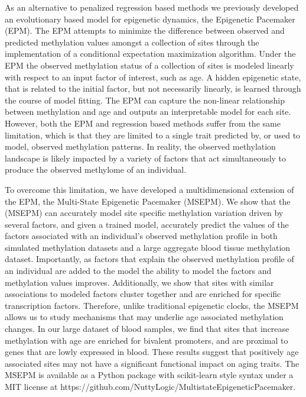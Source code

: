 \documentclass{article}
\begin{document}
{\begin{linenumbers}
As an alternative to penalized regression based methods we previously developed an evolutionary based model for 
epigenetic dynamics, the Epigenetic Pacemaker (EPM)\cite{Farrell2020-bn,Snir2016-dv}. The EPM 
attempts to minimize the difference between observed and predicted methylation values amongst a collection of 
sites through the implementation of a conditional expectation maximization algorithm\cite{Snir2020-tc}. Under the EPM 
the observed methylation status of a collection of sites is modeled linearly with respect to an input factor of
 interest, such as age. A hidden epigenetic state, that is related to the initial factor, but not necessarily 
 linearly, is learned through the course of model fitting. The EPM can capture the non-linear relationship 
 between methylation and age\cite{Snir2019-ii} and outputs an interpretable model for each site. However,
  both the EPM and regression based methods suffer from the same limitation, which is that they are limited
  to a single trait predicted by, or used to model, observed methylation patterns. In reality, the observed 
  methylation landscape is likely impacted by a variety of factors that act simultaneously to produce the 
  observed methylome of an individual. 

To overcome this limitation, we have developed a multidimensional extension of the EPM, the Multi-State 
Epigenetic Pacemaker (MSEPM).  We show that the (MSEPM) can accurately model  site specific methylation 
variation driven by several factors, and given a trained model, accurately predict the values of the 
factors associated with an individual’s observed methylation profile in both simulated methylation 
datasets and a large aggregate blood tissue methylation dataset. Importantly, as factors that explain 
the observed methylation profile of an individual are added to the model the ability to model the factors 
and methylation values improves. Additionally, we show that sites with similar associations to modeled factors 
cluster together and are enriched for specific transcription factors. Therefore, unlike traditional epigenetic 
clocks, the MSEPM allows us to study mechanisms that may underlie age associated methylation changes.  In our 
large dataset of blood samples, we find that sites that increase methylation with age are enriched for bivalent 
promoters, and are proximal to genes that are lowly expressed in blood.  These results suggest that positively 
age associated sites may not have a significant functional impact on aging traits. The MSEPM is available as a 
Python package with scikit-learn style syntax under a MIT license at https://github.com/NuttyLogic/MultistateEpigeneticPacemaker. 


\end{linenumbers}}
\end{document}
